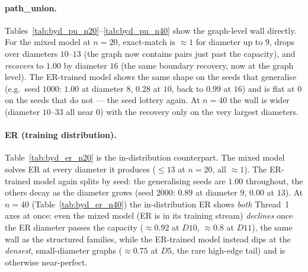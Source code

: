 \documentclass[11pt,a4paper]{article}
\begin{document}
\paragraph{path\_union.} Tables~\ref{tab:byd_pu_n20}--\ref{tab:byd_pu_n40} show the graph-level
wall directly. For the mixed model at $n=20$, exact-match is $\approx1$ for diameter up to $9$,
drops over diameters $10$--$13$ (the graph now contains pairs just past the capacity), and
\emph{recovers} to $1.00$ by diameter $16$ (the same boundary recovery, now at the graph level).
The ER-trained model shows the same shape on the seeds that generalise (e.g.\ seed $1000$:
$1.00$ at diameter $8$, $0.28$ at $10$, back to $0.99$ at $16$) and is flat at $0$ on the seeds
that do not --- the seed lottery again. At $n=40$ the wall is wider (diameter $10$--$33$ all near
$0$) with the recovery only on the very largest diameters.

\paragraph{ER (training distribution).} Table~\ref{tab:byd_er_n20} is the in-distribution
counterpart. The mixed model solves ER at every diameter it produces ($\le13$ at $n=20$, all
$\approx1$). The ER-trained model again splits by seed: the generalising seeds are $1.00$
throughout, the others decay as the diameter grows (seed $2000$: $0.89$ at diameter $9$, $0.00$
at $13$). At $n=40$ (Table~\ref{tab:byd_er_n40}) the in-distribution ER shows \emph{both} Thread~1
axes at once: even the mixed model (ER is in its training stream) \emph{declines} once the ER
diameter passes the capacity ($\approx0.92$ at $D10$, $\approx0.8$ at $D11$), the same wall as the
structured families, while the ER-trained model instead dips at the \emph{densest}, small-diameter
graphs ($\approx0.75$ at $D5$, the rare high-edge tail) and is otherwise near-perfect.
\end{document}

